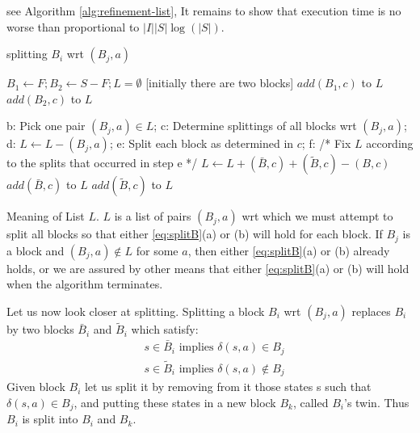 see Algorithm \ref{alg:refinement-list}, It remains to show that execution time is no worse than proportional to $|I||S|\log(|S|)$.

\begin{algorithm}  
	\caption{splitting $B_i$ wrt $(B_j, a)$} 
	\label{alg:refinement-list} 
	\begin{algorithmic}%
		\State $B_1 \gets F; B_2\gets S-F; L=\emptyset$  [initially there are two blocks]  
				\State $add(B_1,c)$ to $L$
			\Else
				\State $add(B_2,c)$ to $L$
	        \EndIf
		\EndFor
		
			\State b: Pick one pair $(B_j,a)\in L$;
			\State c: Determine splittings of all blocks wrt $(B_j,a)$;
			\State d: $L\gets L-(B_j,a)$;
			\State e: Split each block as determined in $c$;
			\State f: /* Fix $L$ according to the splits that occurred in step e */
						\State $L\gets L+(\bar{B},c)+(\tilde{B},c)-(B,c)$
					\Else
							\State $add(\bar{B},c)$ to $L$
						\Else
							\State $add(\tilde{B},c)$ to $L$
						\EndIf
					\EndIf
				\EndFor
			\EndFor
		\EndWhile
	\end{algorithmic}   
\end{algorithm}

Meaning of List $L$. $L$ is a list of pairs $(B_j, a)$ wrt which we must attempt to split all blocks so that either \ref{eq:splitB}(a) or (b) will hold for each block. If $B_j$ is a block and $(B_j, a)\notin L$ for some $a$, then either \ref{eq:splitB}(a) or (b) already holds, or we are assured by other means that either \ref{eq:splitB}(a) or (b) will hold when the algorithm terminates.

Let us now look closer at splitting. Splitting a block $B_i$ wrt $(B_j,a)$ replaces $B_i$ by two blocks $\bar{B}_i$ and $\tilde{B}_i$ which satisfy:
\begin{align*}
& s\in\bar{B}_i \text{  implies  } \delta(s,a)\in B_j \\
& s\in\tilde{B}_i \text{  implies  } \delta(s,a)\notin B_j 
\end{align*}
Given block $B_i$ let us split it by removing from it those states s such that $\delta(s,a)\in B_j$, and putting these states in a new block $B_k$, called $B_i$'s twin. Thus $B_i$ is split into $B_i$ and $B_k$.


